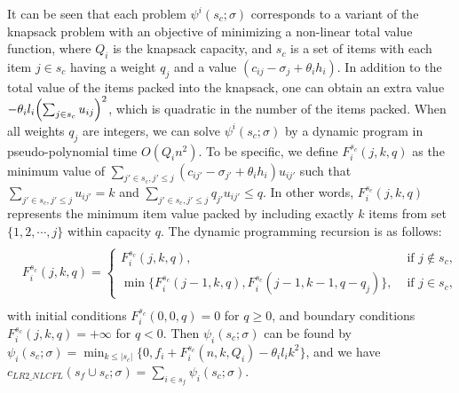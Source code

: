 \documentclass[ijoc,nonblindrev]{informs3} %
\begin{document}
It can be seen that each problem $\psi^i(s_c;\sigma)$ corresponds to a variant of the knapsack problem with an objective of minimizing a non-linear total value function, where $Q_i$ is the knapsack capacity, and $s_c$ is a set of items with each item $j\in s_c$ having a weight $q_j$ and a value $(c_{ij}-\sigma_j+\theta_ih_i)$.
In addition to the total value of the items packed into the knapsack, one can obtain an extra value $-\theta_il_i \Bigl( \sum_{j \in s_c}u_{ij}\Bigr)^2$, which is quadratic in the number of the items packed. When all weights $q_j$ are integers, we can solve $\psi^i(s_c;\sigma)$ by a dynamic program in pseudo-polynomial time $O(Q_in^2)$.
To be specific, we define $F^{s_c}_i(j,k,q)$ as the minimum value of $\sum_{j'\in s_c,j'\leq j}(c_{ij'}-\sigma_{j'}+\theta_ih_i)u_{ij'}$ such that $\sum_{j'\in s_c,j'\leq j}u_{ij'}=k$ and $\sum_{j'\in s_c,j'\leq j}q_{j'}u_{ij'}\leq q$.
In other words, $F^{s_c}_i(j,k,q)$ represents the minimum item value packed by including exactly $k$ items from set $\{1,2,\cdots,j\}$ within capacity $q$.
The dynamic programming recursion is as follows:
\begin{eqnarray*}
\begin{aligned}
\begin{split}
F^{s_c}_i(j,k,q)=\left\{
\begin{array}{ll}
F^{s_c}_i(j,k,q), & \mbox{ if } j\not\in s_c,
\\[3mm]
\min\big\{F^{s_c}_i(j-1,k,q),F^{s_c}_i(j-1,k-1,q-q_j) \big\}, & \mbox{ if } j\in s_c,
\end{array}\right.
\end{split}
\end{aligned}
\end{eqnarray*}
with initial conditions $F^{s_c}_i(0,0,q)=0$ for  $q\geq 0$, and boundary conditions $F^{s_c}_i(j,k,q)=+\infty$ for $q<0$. Then $\psi_i(s_c;\sigma)$ can be found by $\psi_i(s_c;\sigma) = \min_{k\leq |s_c|}\bigl\{ 0, f_i+F^{s_c}_i(n,k,Q_i)-\theta_i l_i k^2\bigr\}$, and we have $c_{LR2\_NLCFL}(s_f \cup s_c;\sigma) = \sum_{i \in s_f} \psi_i(s_c;\sigma)$.
\end{document}
